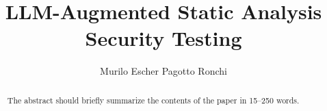 \documentclass[runningheads]{llncs}
\begin{document}
%
\title{LLM-Augmented Static Analysis Security Testing}
%
%
%
\author{Murilo Escher Pagotto Ronchi}
%
\maketitle %
%
%
\begin{abstract}
The abstract should briefly summarize the contents of the paper in
15--250 words.

\end{abstract}
%
%







%
%
\appendix

%
%


%
\end{document}

